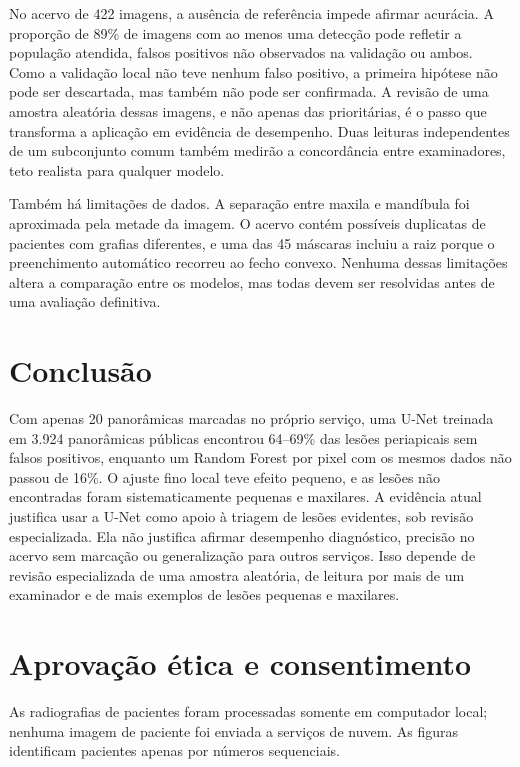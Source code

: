 \documentclass[twocolumn]{article}
\begin{document}
No acervo de 422 imagens, a ausência de referência impede afirmar acurácia. A proporção de 89\% de imagens com ao menos uma detecção pode refletir a população atendida, falsos positivos não observados na validação ou ambos. Como a validação local não teve nenhum falso positivo, a primeira hipótese não pode ser descartada, mas também não pode ser confirmada. A revisão de uma amostra aleatória dessas imagens, e não apenas das prioritárias, é o passo que transforma a aplicação em evidência de desempenho. Duas leituras independentes de um subconjunto comum também medirão a concordância entre examinadores, teto realista para qualquer modelo.

Também há limitações de dados. A separação entre maxila e mandíbula foi aproximada pela metade da imagem. O acervo contém possíveis duplicatas de pacientes com grafias diferentes, e uma das 45 máscaras incluiu a raiz porque o preenchimento automático recorreu ao fecho convexo. Nenhuma dessas limitações altera a comparação entre os modelos, mas todas devem ser resolvidas antes de uma avaliação definitiva.

\section{Conclusão}

Com apenas 20 panorâmicas marcadas no próprio serviço, uma U-Net treinada em 3.924 panorâmicas públicas encontrou 64--69\% das lesões periapicais sem falsos positivos, enquanto um Random Forest por pixel com os mesmos dados não passou de 16\%. O ajuste fino local teve efeito pequeno, e as lesões não encontradas foram sistematicamente pequenas e maxilares. A evidência atual justifica usar a U-Net como apoio à triagem de lesões evidentes, sob revisão especializada. Ela não justifica afirmar desempenho diagnóstico, precisão no acervo sem marcação ou generalização para outros serviços. Isso depende de revisão especializada de uma amostra aleatória, de leitura por mais de um examinador e de mais exemplos de lesões pequenas e maxilares.

\section*{Aprovação ética e consentimento}

 As radiografias de pacientes foram processadas somente em computador local; nenhuma imagem de paciente foi enviada a serviços de nuvem. As figuras identificam pacientes apenas por números sequenciais.
\end{document}
